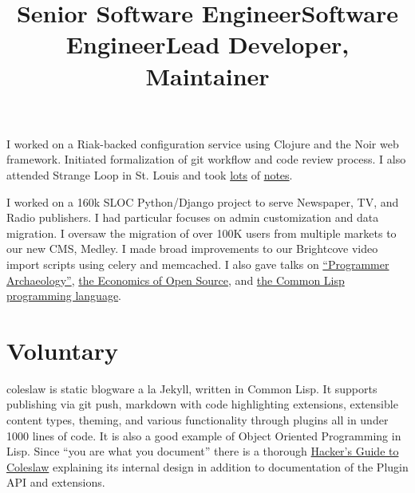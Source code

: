 \documentclass[margintitle,line]{res}
\renewcommand{\subsection}[1]{\section{\normalfont #1}}
\begin{document}
\begin{resume}
\title{Senior Software Engineer}
\begin{position}
  I worked on a Riak-backed configuration service using Clojure and
  the Noir web framework. Initiated formalization of git
  workflow and code review process. I also attended Strange Loop in
  St. Louis and took
  \href{http://blog.redlinernotes.com/posts/Strange-Loop-Notes---Day-2.html}{lots}
  of
  \href{http://blog.redlinernotes.com/posts/Strange-Loop-Notes---Day-1.html}{notes}.
\end{position}

\title{Software Engineer}
\begin{position}
  I worked on a 160k SLOC Python/Django project to serve Newspaper,
  TV, and Radio publishers.  I had particular focuses on admin
  customization and data migration. I oversaw the migration of over
  100K users from multiple markets to our new CMS, Medley.
  I made broad improvements to our Brightcove video import
  scripts using celery and memcached. I also gave talks on
  \href{http://redlinernotes.com/docs/talks/opa.html}{``Programmer
    Archaeology''},
  \href{http://redlinernotes.com/docs/talks/wosw.html}{the Economics
    of Open Source}, and
  \href{http://redlinernotes.com/docs/talks/cl-gbu.html}{the Common
    Lisp programming language}.
\end{position}

\subsection{Voluntary}

\title{Lead Developer, Maintainer}
\begin{position}
  coleslaw is static blogware a la Jekyll, written in Common Lisp. It
  supports publishing via git push, markdown with code highlighting extensions,
  extensible content types, theming, and various functionality through plugins
  all in under 1000 lines of code. It is also a good example of Object Oriented
  Programming in Lisp. Since ``you are what you document'' there is a thorough
  \href{https://github.com/redline6561/coleslaw/blob/master/docs/hacking.md}{Hacker's Guide to Coleslaw}
  explaining its internal design in addition to documentation of the Plugin API
  and extensions.
\end{position}


\end{resume}
\end{document}
